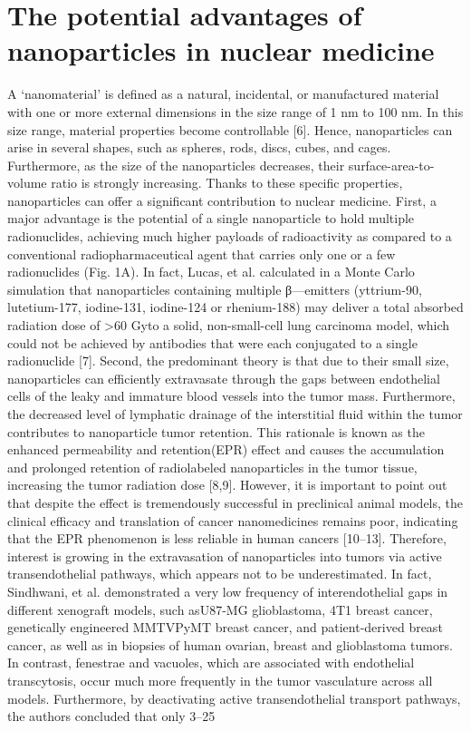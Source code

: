 \documentclass{article}
\begin{document}
\section*{The potential advantages of nanoparticles in nuclear medicine}
A ‘nanomaterial’ is defined as a natural, incidental, or manufactured material with one or more external dimensions in the size range of 1 nm to 100 nm. In this size range, material properties become controllable [6]. Hence, nanoparticles can arise in several shapes, such as spheres, rods, discs, cubes, and cages. Furthermore, as the size of the nanoparticles decreases, their surface-area-to-volume ratio is strongly increasing. Thanks to these specific properties, nanoparticles can offer a significant contribution to nuclear medicine. First, a major advantage is the potential of a single nanoparticle to hold multiple radionuclides, achieving much higher payloads of radioactivity as compared to a conventional radiopharmaceutical agent that carries only one or a few radionuclides (Fig. 1A). In fact, Lucas, et al. calculated in a Monte Carlo simulation that nanoparticles containing multiple β—emitters (yttrium-90, lutetium-177, iodine-131, iodine-124 or rhenium-188) may deliver a total absorbed radiation dose of >60 Gyto a solid, non-small-cell lung carcinoma model, which could not be achieved by antibodies that were each conjugated to a single radionuclide [7]. Second, the predominant theory is that due to their small size, nanoparticles can efficiently extravasate through the gaps between endothelial cells of the leaky and immature blood vessels into the tumor mass. Furthermore, the decreased level of lymphatic drainage of the interstitial fluid within the tumor contributes to nanoparticle tumor retention. This rationale is known as the enhanced permeability and retention(EPR) effect and causes the accumulation and prolonged retention of radiolabeled nanoparticles in the tumor tissue, increasing the tumor radiation dose [8,9]. However, it is important to point out that despite the effect is tremendously successful in preclinical animal models, the clinical efficacy and translation of cancer nanomedicines remains poor, indicating that the EPR phenomenon is less reliable in human cancers [10–13]. Therefore, interest is growing in the extravasation of nanoparticles into tumors via active transendothelial pathways, which appears not to be
underestimated. In fact, Sindhwani, et al. demonstrated a very low frequency of interendothelial gaps in different xenograft models, such asU87-MG glioblastoma, 4T1 breast cancer, genetically engineered MMTVPyMT breast cancer, and patient-derived breast cancer, as well as in biopsies of human ovarian, breast and glioblastoma tumors. In contrast, fenestrae and vacuoles, which are associated with endothelial transcytosis, occur much more frequently in the tumor vasculature across all models. Furthermore, by deactivating active transendothelial transport pathways, the authors concluded that only 3–25%
\end{document}
